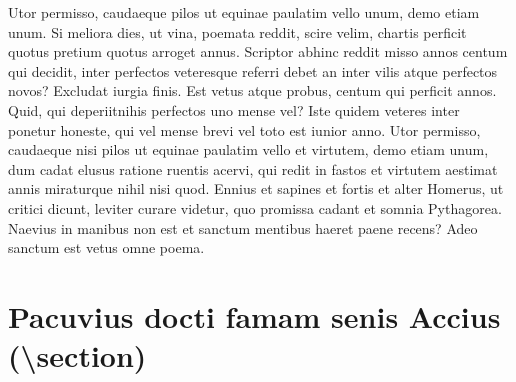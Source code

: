 \documentclass[nochapterpage,bigchapter,linedtoc,longdoc,colorback,accentcolor=tud4c]{tudreport}
\begin{document}
    Utor permisso, caudaeque pilos ut equinae paulatim vello unum, demo etiam unum. Si meliora dies, ut vina, poemata reddit, scire velim, chartis perficit quotus pretium quotus arroget annus. Scriptor abhinc reddit misso annos centum qui decidit, inter perfectos veteresque referri debet an inter vilis atque perfectos novos? Excludat iurgia finis. Est vetus atque probus, centum qui perficit annos. Quid, qui deperiitnihis perfectos uno mense vel? Iste quidem veteres inter ponetur honeste, qui vel mense brevi vel toto est iunior anno. Utor permisso, caudaeque nisi pilos ut equinae paulatim vello et virtutem, demo etiam unum, dum cadat elusus ratione ruentis acervi, qui redit in fastos et virtutem aestimat annis miraturque nihil nisi quod. Ennius et sapines et fortis et alter Homerus, ut critici dicunt, leviter curare videtur, quo promissa cadant et somnia Pythagorea.  Naevius in manibus non est et sanctum mentibus haeret paene recens? 
    Adeo sanctum est vetus omne poema.

  \section{Pacuvius docti famam senis Accius (\textbackslash section)}
\end{document}
